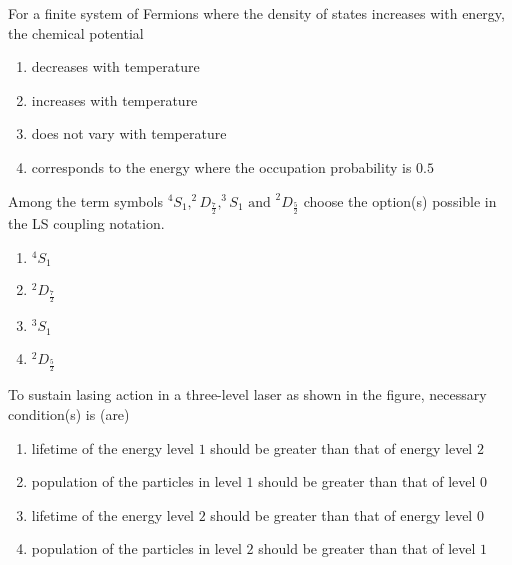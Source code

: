     \item For a finite system of Fermions where the density of states increases with energy, the chemical potential
    \begin{enumerate}
        \item decreases with temperature
        \item increases with temperature
        \item does not vary with temperature
        \item corresponds to the energy where the occupation probability is $0.5$
    \end{enumerate}

    \item Among the term symbols $^4 S_1 , ^2 D_{\frac{7}{2}} , ^3 S_1 \text{ and } ^2 D_{\frac{5}{2}}$ choose the option(s) possible in the LS coupling notation.
    \begin{enumerate}
        \item $^4 S_1$
        \item $^2 D_{\frac{7}{2}}$
        \item $^3 S_1$
        \item $^2 D_{\frac{5}{2}}$
    \end{enumerate}

    \item To sustain lasing action in a three-level laser as shown in the figure, necessary condition(s) is (are)
    \begin{figure}[!ht]
\centering
{}%

\label{fig:my_label}
\end{figure}
    \begin{enumerate}
        \item lifetime of the energy level $1$ should be greater than that of energy level $2$
        \item population of the particles in level $1$ should be greater than that of level $0$
        \item lifetime of the energy level $2$ should be greater than that of energy level $0$
        \item population of the particles in level $2$ should be greater than that of level $1$
    \end{enumerate}

